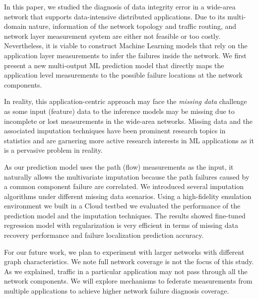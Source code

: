 In this paper, we studied the diagnosis of data integrity error in a wide-area network that supports data-intensive distributed applications. 
Due to its multi-domain nature, information of the network topology and traffic routing, and network layer measurement system 
are either not feasible or too costly. Nevertheless, it is viable to construct Machine Learning models that rely on the application layer 
measurements to infer the failures inside the network. We first present a new multi-output ML prediction model that directly maps 
the application level measurements to the possible failure locations at the network components.   

In reality, this application-centric approach may face the {\it missing data} challenge 
as some input (feature) data to the inference models may be missing due to incomplete or lost measurements in the wide-area networks. 
Missing data and the associated imputation techniques have been prominent research topics in statistics and are garnering more 
active research interests in ML applications as it is a pervasive problem in reality.
 
As our prediction model uses the path (flow) measurements as the input, it naturally allows the multivariate imputation because the path failures 
caused by a common component failure are correlated. We introduced several imputation algorithms under different missing data scenarios.
Using a high-fidelity emulation environment we built in a Cloud testbed we evaluated the performance of the prediction model and 
the imputation techniques. The results showed fine-tuned regression model with regularization is very efficient in terms of missing data recovery performance
and failure localization prediction accuracy.   

For our future work, we plan to experiment with larger networks with different graph characteristics. We note full network coverage is not the focus of this study. 
As we explained, traffic in a particular application may not pass through all the network components. We will explore mechanisms to federate measurements from 
multiple applications to achieve higher network failure diagnosis coverage. 

